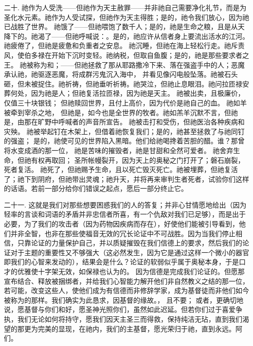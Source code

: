 二十. 祂作为人受洗——但祂作为天主赦罪——并非祂自己需要净化礼节，而是为圣化水元素。祂作为人受试探，但祂作为天主得胜；是的，祂令我们放心，因为祂已战胜了世界。 祂饿了——但祂喂饱了数千人；是的，祂是生命之粮，且是从天降下的。祂渴了——但祂呼喊说：。是的，祂应许从信者身上要流出活水的江河。祂疲倦了，但祂是疲惫和负重者之安息。 祂沉睡，但祂在海上轻松行走。祂斥责风，使伯多禄在开始下沉时变轻。祂纳税，但取自鱼腹；是的，祂是那些要求者之王。 祂被称为和；——但祂拯救了那从耶路撒冷下来、落在强盗手中的人；恶魔承认祂，祂驱逐恶魔，将成群污鬼沉入海中， 并看见像闪电般坠落。祂被石头砸，但未被捉住。祂祈祷，但祂垂听祈祷。祂哭泣，但祂止息眼泪。祂问拉匝禄安葬何处，因为祂是人；但祂复活拉匝禄，因为祂是天主。 祂被出卖，且极廉价，仅值三十块银钱； 但祂赎回世界，且付上高价，因为代价是祂自己的血。 祂如羊被牵到宰杀之地， 但祂是，如今也是全世界的牧者。祂如羔羊沉默不言，但祂是，由那在旷野中呼喊者的声音所宣告。 祂被击打和受伤，但祂医治各种疾病和灾殃。 祂被举起钉在木架上，但借着祂恢复我们；是的，祂甚至拯救了与祂同钉的强盗； 是的，祂使可见的世界陷入黑暗。他们给祂喝搀着苦胆的醋。谁？那曾将水变成酒的那一位， 祂是苦味的摧毁者，祂是甘甜和全然可爱者。 祂舍弃生命，但祂有权再取回； 圣所帐幔裂开，因为天上的奥秘之门打开了；磐石崩裂，死者复活。 祂死了，但祂赐予生命，且以死亡毁灭死亡。祂被埋葬，但祂复活了；祂下到阴府，但祂带出灵魂；祂升天，并将再来审判生者死者，试验你们这样的话语。若前一部分给你们错误之起点，愿后一部分终止它。\par

二十一. 这就是我们对那些想要困惑我们的人的答复；并非心甘情愿地给出（因为轻率的言谈和词语的矛盾并非忠信者所喜，有一个仇敌对我们已足够），而是出于必要，为了我们的攻击者（因为药物因疾病而存在），好使他们能被引导看到，他们并非全智，也非在那些使福音无效的冗长论证中不可战胜。因为当我们停止相信，只靠论证的力量保护自己，并以质疑摧毁在我们信德上的要求，然后我们的论证对于主题的重要性又不够强大（这必然发生，因为它是通过这样一个微小的器官即我们的心智来发动的），结果会是什么？论证的软弱似乎属于奥秘本身，于是口才的优雅使十字架无效，如保禄也认为的。 因为信德是完成我们论证的。但愿那宣布结合、释放被捆绑者，并给我们心智能力解开他们非自然教义之结的那一位，若可能，改变这些人，使他们成为有信德而非修辞学家，成为基督徒而非他们如今被称为的那样。我们确实为此恳求，因基督的缘故。， 且不要； 或者，更确切地说，愿基督与你们和好，愿圣神光照你们，虽然如此迟延。但若你们过于喜爱争执，我们无论如何将持守，愿我们因天主圣三而得救，保持纯洁无玷，直到我们渴望的那更为完美的显现，在祂内，我们的主基督，愿光荣归于祂，直到永远。阿们。\par

